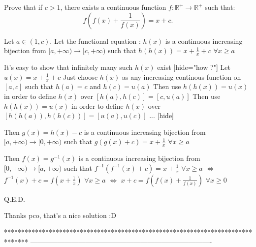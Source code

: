 


\begin{solution}
	\begin{tcolorbox}Prove that if $c>1$, there exists a continuous function $f:\mathbb{R}^+\to\mathbb{R}^+$ such that: \[f\left(f(x)+\frac{1}{f(x)}\right)=x+c.\]\end{tcolorbox}
Let $a\in(1,c)$.
Let the functional equation :
$h(x)$ is a continuous increasing bijection from $[a,+\infty)\to[c,+\infty)$ such that $h(h(x))=x+\frac 1x+c$ $\forall x\ge a$

It's easy to show that infinitely many such $h(x)$ exist
[hide="how ?"]
Let $u(x)=x+\frac 1x+c$
Just choose $h(x)$ as any increasing continous function on $[a,c]$ such that $h(a)=c$ and $h(c)=u(a)$
Then use $h(h(x))=u(x)$ in order to define $h(x)$ over $[h(a),h(c)]=[c,u(a)]$
Then use $h(h(x))=u(x)$ in order to define $h(x)$ over $[h(h(a)),h(h(c))]=[u(a),u(c)]$
...
[\/hide]

Then $g(x)=h(x)-c$ is a continuous increasing bijection from $[a,+\infty)\to[0,+\infty)$ such that $g(g(x)+c)=x+\frac 1x$ $\forall x\ge a$

Then $f(x)=g^{-1}(x)$ is a continuous increasing bijection from $[0,+\infty)\to[a,+\infty)$ such that $f^{-1}(f^{-1}(x)+c)=x+\frac 1x$ $\forall x\ge a$
$\iff$ $f^{-1}(x)+c=f(x+\frac 1x)$ $\forall x\ge a$
$\iff$ $x+c=f(f(x)+\frac 1{f(x)})$ $\forall x\ge 0$

Q.E.D.
\end{solution}



\begin{solution}
	Thanks pco, that's a nice solution :D
\end{solution}
*******************************************************************************
-------------------------------------------------------------------------------

